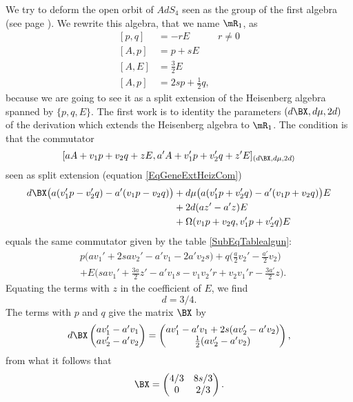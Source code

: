 We try to deform the open orbit of $AdS_4$ seen as the group of the first algebra (see page  \pageref{PgAlgUn}). We rewrite this algebra, that we name $\mR_{1}$, as
\begin{subequations}   \label{SubEqTablealgun}
	\begin{align}
		[p,q] & =-rE                 & r\neq 0 \\
		[A,p] & =p+sE                          \\
		[A,E] & =\frac{ 3 }{2}E                \\
		[A,p] & =2sp+\frac{ 1 }{2}q,
	\end{align}
\end{subequations}
because we are going to see it as a split extension of the Heisenberg algebra spanned by $\{ p,q,E \}$. The first work is to identity the parameters $(d\BX,d\mu,2d)$ of the derivation which extends the Heisenberg algebra to $\mR_{1}$. The condition is that the commutator
\[
	[  aA+v_1p+v_2q+zE,a'A+v_1'p+v_2'q+z'E  ]_{(d\BX,d\mu,2d)}
\]
seen as split extension (equation \eqref{EqGeneExtHeizCom})
\[
	\begin{split}
		d\BX\big( a(v_1'p-v_2'q)-a'(v_1p-v_2q) \big)&+ d\mu\big( a(v_1'p+v_2'q)-a'(v_1p+v_2q) \big)E\\
		&+2d(az'-a'z)E\\
		&+\Omega(v_1p+v_2q,v_1'p+v_2'q) E
	\end{split}
\]
equals the same commutator given by the table \eqref{SubEqTablealgun}:
\begin{align*}
	 & p\big(av_1'+2sav_2'-a'v_1-2a'v_2s\big)+q\big( \frac{ a }{2}v_2'-\frac{ a' }{2}v_2 \big) \\
	 & +E\big( sav_1'+\frac{ 3a }{2}z'-a'v_1s-v_1v_2'r+v_2v_1'r-\frac{ 3a' }{2}z \big).
\end{align*}
Equating the terms with $z$ in the coefficient of $E$, we find
\begin{equation}
	d=3/4.
\end{equation}
The terms with $p$ and $q$ give the matrix $\BX$ by
\[
	d\BX\begin{pmatrix}
		av_1'-a'v_1 \\
		av_2'-a'v_2
	\end{pmatrix}=
	\begin{pmatrix}
		av_1'-a'v_1+2s(av_2'-a'v_2) \\
		\frac{ 1 }{2}(av_2'-a'v_2)
	\end{pmatrix},
\]
from what it follows that
\begin{equation}
	\BX=\begin{pmatrix}
		4/3 & 8s/3 \\
		0   & 2/3
	\end{pmatrix}.
\end{equation}
